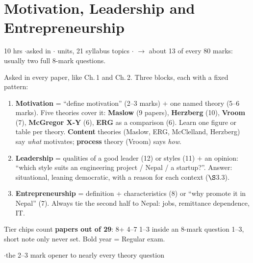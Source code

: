 \section{Motivation, Leadership and Entrepreneurship}
{\color{sub}\footnotesize 10 hrs \gap$\cdot$\gap asked in 
\gap$\cdot$ units, 21 syllabus topics \gap$\cdot$\gap {}
$\rightarrow$ about 13 of every 80 marks: usually two full 8-mark questions.}

\vspace{3pt}\noindent
\colorbox{gdL}{\makebox[\dimexpr\textwidth-2\fboxsep][l]{%
  \textcolor{gd}{\bfseries\footnotesize READ THIS FIRST}}}
\par\nobreak\vspace{3pt}

Asked in every paper, like Ch.\,1 and Ch.\,2. Three blocks, each with a fixed pattern:
\begin{enumerate}[label=\arabic*., leftmargin=1.4em, itemsep=1pt]
  \item \textbf{Motivation} = ``define motivation'' (2--3 marks) $+$ one named theory
    (5--6 marks). Five theories cover it: \textbf{Maslow} (9 papers), \textbf{Herzberg} (10),
    \textbf{Vroom} (7), \textbf{McGregor X-Y} (6), \textbf{ERG} as a comparison (6). Learn one
    figure or table per theory. \textbf{Content} theories (Maslow, ERG, McClelland,
    Herzberg) say \textit{what} motivates; \textbf{process} theory (Vroom) says \textit{how}.
  \item \textbf{Leadership} = qualities of a good leader (12) or styles (11) $+$ an opinion:
    ``which style suits an engineering project / Nepal / a startup?''. Answer: situational,
    leaning democratic, with a reason for each context ($\S$3.3).
  \item \textbf{Entrepreneurship} = definition + characteristics (8) or ``why promote it in
    Nepal'' (7). Always tie the second half to Nepal: jobs, remittance dependence, IT.
\end{enumerate}
Tier chips count \textbf{papers out of 29}:  8+ \gap {} 4--7 \gap {} 1--3
inside an 8-mark question \gap {} 1--3, short note only \gap \tN{} never set.
Bold year = Regular exam.

\hr


{\color{sub}\footnotesize {}  \gap$\cdot$\gap the 2--3 mark opener to nearly every theory question}

